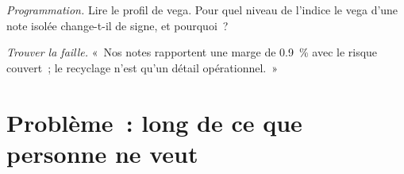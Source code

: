 \begin{exercise}[$\star\star\star$]\label{exo:s2:hedging-a-structured-products-book:7}
\emph{Programmation.} Lire le profil de vega. Pour quel niveau de l'indice le vega d'une note isolée change-t-il de signe, et pourquoi~?
\end{exercise}

\begin{exercise}[$\star\star\star$]\label{exo:s2:hedging-a-structured-products-book:8}
\emph{Trouver la faille.} «~Nos notes rapportent une marge de 0.9~\% avec le risque couvert~; le recyclage n'est qu'un détail opérationnel.~»
\end{exercise}

\section{Problème~: long de ce que personne ne veut}

